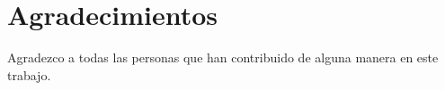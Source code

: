 {\justifying
	\chapter*{Agradecimientos}
	Agradezco a todas las personas que han contribuido de alguna manera en este trabajo.
}